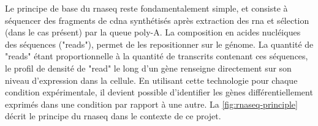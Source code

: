 \documentclass[../main.tex]{subfiles}
\begin{document}


Le principe de base du \gls{rnaseq} reste fondamentalement simple, et consiste à séquencer des fragments de \gls{cdna} synthétisés après extraction des \gls{rna} et sélection (dans le cas présent) par la queue poly-A.
La composition en acides nucléiques des séquences ("reads"), permet de les repositionner sur le génome.
La quantité de "reads" étant proportionnelle à la quantité de transcrits contenant ces séquences, le profil de densité de "read" le long d'un gène renseigne directement sur son niveau d'expression dans la cellule.
En utilisant cette technologie pour chaque condition expérimentale, il devient possible d'identifier les gènes différentiellement exprimés dans une condition par rapport à une autre.
La \autoref{fig:rnaseq-principle} décrit le principe du \gls{rnaseq} dans le contexte de ce projet.
\end{document}

